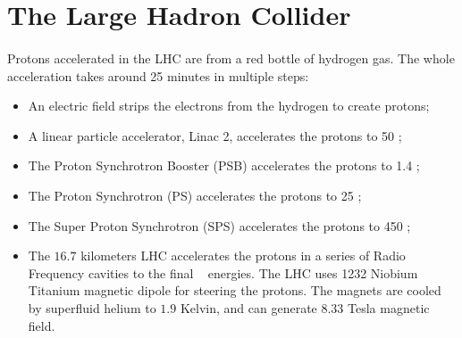 \section{The Large Hadron Collider}
\label{sec:LHC}
\paragraph{}
Protons accelerated in the LHC are from a red bottle of hydrogen gas. 
The whole acceleration takes around 25 minutes in multiple steps:
\begin{itemize}
\item An electric field strips the electrons from the hydrogen to create protons; 
\item A linear particle accelerator, Linac 2, accelerates the protons to 50 \MeV; 
\item The Proton Synchrotron Booster (PSB) accelerates the protons to 1.4 \GeV;
\item The Proton Synchrotron (PS) accelerates the protons to 25 \GeV; 
\item The Super Proton Synchrotron (SPS) accelerates the protons to 450 \GeV;
\item The $16.7$ kilometers LHC accelerates the protons in a series of Radio Frequency cavities to the final \TeV~ energies. The LHC uses 1232 Niobium Titanium magnetic dipole for steering the protons. The magnets are cooled by superfluid helium to $1.9$ Kelvin, and can generate $8.33$ Tesla magnetic field.
\end{itemize}

